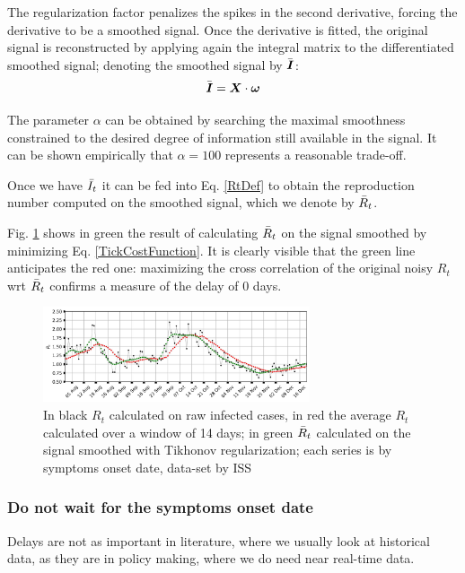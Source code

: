 \documentclass[graybox]{svmult}
\begin{document}
The regularization factor penalizes the spikes in the second derivative, forcing the derivative to be a smoothed signal. Once the derivative is fitted, the original signal is reconstructed by applying again the integral matrix to the differentiated smoothed signal; denoting the smoothed signal by $\Bar{\vec{I}}$:
$$\Bar{\vec{I}} = \vec{X}\cdot\vec{\omega}$$

The parameter $\alpha$ can be obtained by searching the maximal smoothness constrained to the desired degree of information still available in the signal. It can be shown empirically that $\alpha = 100$ represents a reasonable trade-off.

Once we have $\Bar{I}_t$ it can be fed into Eq. \ref{RtDef} to obtain the reproduction number computed on the smoothed signal, which we denote by $\Bar{R}_t$.

Fig. \ref{naive_Rt_symptoms_onset_smoothed} shows in green the result of calculating $\Bar{R}_t$ on the signal smoothed by minimizing Eq. \ref{TickCostFunction}. It is clearly visible that the green line anticipates the red one: maximizing the cross correlation of the original noisy $R_t$ wrt $\Bar{R}_t$ confirms a measure of the delay of 0 days.

\begin{figure}[t]
\center
\includegraphics[width=0.7\textwidth]{Rt_images/naive_Rt_symptoms_onset_smoothed.jpg}
\caption{In black $R_{t}$ calculated on raw infected cases, in red the average $R_t$ calculated over a window of 14 days; in green $\Bar{R}_{t}$ calculated on the signal smoothed with Tikhonov regularization; each series is by symptoms onset date, data-set by ISS}
\label{naive_Rt_symptoms_onset_smoothed}
\end{figure}

\subsubsection{Do not wait for the symptoms onset date}
\label{notification_date}

Delays are not as important in literature, where we usually look at historical data, as they are in policy making, where we do need near real-time data.
\end{document}
